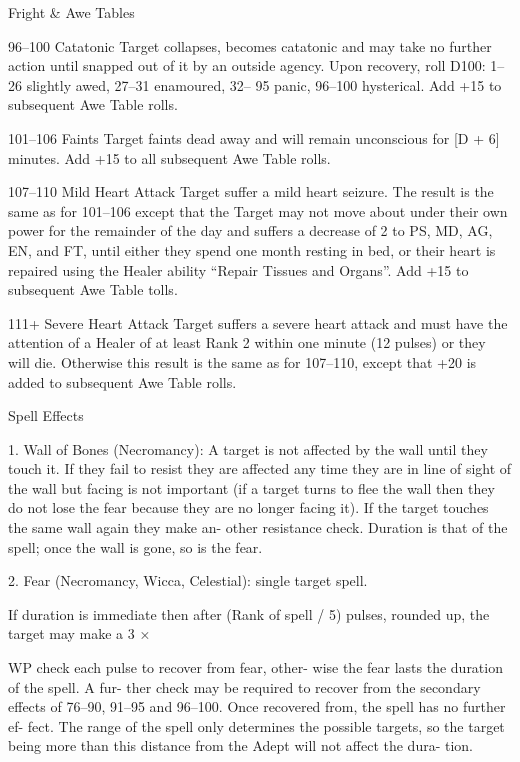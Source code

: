 \begin{Tables}{Fright \& Awe Tables}
\begin{Description}
96–100   Catatonic Target collapses, becomes catatonic and may take no 
further action until snapped out of it by an outside agency. Upon 
recovery, roll D100: 1–26 slightly awed, 27–31 enamoured, 32–
95 panic, 96–100 hysterical. Add +15 to subsequent Awe Table 
rolls. 

101–106   Faints Target faints dead away and will remain unconscious for 
[D + 6] minutes. Add +15 to all subsequent Awe Table rolls. 

107–110   Mild Heart Attack Target suffer a mild heart seizure. The result 
is the same as for 101–106 except that the Target may not move 
about under their own power for the remainder of the day and 
suffers a decrease of 2 to PS, MD, AG, EN, and FT, until either 
they spend one month resting in bed, or their heart is repaired 
using the Healer ability “Repair Tissues and Organs”. Add +15 to 
subsequent Awe Table tolls. 

\item[111+] Severe Heart Attack Target suffers a severe heart attack
  and must have the attention of a Healer of at least Rank 2 within
  one minute (12 pulses) or they will die. Otherwise this result is
  the same as for 107–110, except that +20 is added to subsequent Awe
  Table rolls.

\end{Description}

\begin{multicols}{3}

Spell Effects 

1.  Wall  of  Bones  (Necromancy):  A  target  is  not 
affected by the wall until they touch it. If they fail 
to resist they are affected any time they are in line 
of sight of the wall but facing is not important (if a 
target  turns  to  flee  the  wall  then  they  do  not  lose 
the fear because they are no longer facing it). If the 
target  touches  the  same  wall  again  they  make  an-
other resistance check. Duration is that of the spell; 
once the wall is gone, so is the fear. 

2.  Fear  (Necromancy,  Wicca,  Celestial):  single 
target spell. 

If duration is immediate then after (Rank of spell / 
5)  pulses,  rounded  up,  the  target  may  make  a  3  × 
 

 

WP  check  each  pulse  to  recover  from  fear,  other-
wise the fear lasts the duration of the spell.  A fur-
ther  check  may  be  required  to  recover  from  the 
secondary  effects  of  76–90,  91–95  and  96–100. 
Once  recovered  from,  the  spell  has  no  further  ef-
fect.  The  range  of  the  spell  only  determines  the 
possible targets, so the target being more than this 
distance  from  the  Adept  will  not  affect  the  dura-
tion. 


\end{multicols}
\end{Tables}
